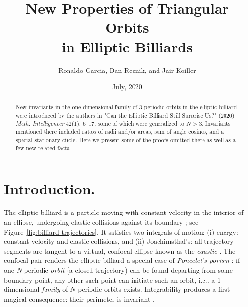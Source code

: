 \documentclass{amsart}
\theoremstyle{definition}
\begin{document}
\title{New Properties of Triangular Orbits\\in Elliptic Billiards}
\date{July, 2020}


 \author{Ronaldo Garcia, Dan Reznik, and Jair Koiller}

\maketitle

\begin{abstract}
New invariants in the one-dimensional family of 3-periodic orbits in the elliptic billiard were introduced by the authors in "Can the Elliptic Billiard Still Surprise Us?"  (2020) \textit{Math. Intelligencer} 42(1): 6--17, some of which were generalized to $N>3$. Invariants mentioned there included ratios of radii and/or areas, sum of angle cosines, and a special stationary circle. Here we present some of the proofs omitted there as well as a few new related facts. \\
\end{abstract}

\section{Introduction.}
\label{sec:intro}
The elliptic billiard is a particle moving with constant velocity in the interior of an ellipse, undergoing elastic collisions against its boundary \cite{rozikov2018,sergei91}; see Figure~\ref{fig:billiard-trajectories}. It satisfies two integrals of motion: (i) energy: constant velocity and elastic collisions, and (ii) Joachimsthal's: all trajectory segments are tangent to a virtual, confocal ellipse known as the {\em caustic} \cite{sergei91}. The confocal pair renders the elliptic billiard a special case of {\em Poncelet's porism} \cite{dragovic11}: if one $N$-periodic {\em orbit} (a closed trajectory) can be found departing from some boundary point, any other such point can initiate such an orbit, i.e., a 1-dimensional {\em family} of $N$-periodic orbits exists. Integrability produces a first magical consequence: their perimeter is invariant \cite{sergei91}. 
\end{document}
